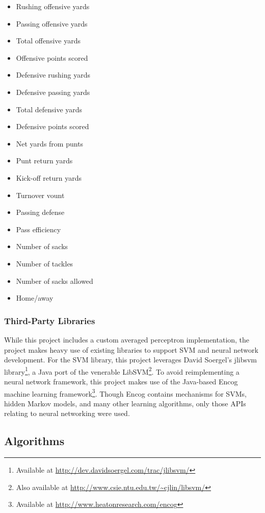 \documentclass[10pt,letterpaper]{article}
\begin{document}
\begin{itemize}

\item Rushing offensive yards
\item Passing offensive yards
\item Total offensive yards
\item Offensive points scored
\item Defensive rushing yards
\item Defensive passing yards
\item Total defensive yards
\item Defensive points scored
\item Net yards from punts
\item Punt return yards
\item Kick-off return yards
\item Turnover vount
\item Passing defense
\item Pass efficiency
\item Number of sacks
\item Number of tackles
\item Number of sacks allowed
\item Home/away

\end{itemize}

\subsubsection{Third-Party Libraries}

While this project includes a custom averaged perceptron implementation, the project makes heavy use of existing libraries to support SVM and neural network development.
For the SVM library, this project leverages David Soergel's jlibsvm library\footnote{Available at \url{http://dev.davidsoergel.com/trac/jlibsvm/}}, a Java port of the venerable LibSVM\footnote{Also available at \url{http://www.csie.ntu.edu.tw/~cjlin/libsvm/}}.
To avoid reimplementing a neural network framework, this project makes use of the Java-based Encog machine learning framework\footnote{Available at \url{http://www.heatonresearch.com/encog}}.
Though Encog contains mechanisms for SVMs, hidden Markov models, and many other learning algorithms, only those APIs relating to neural networking were used.

\subsection{Algorithms}
\end{document}

